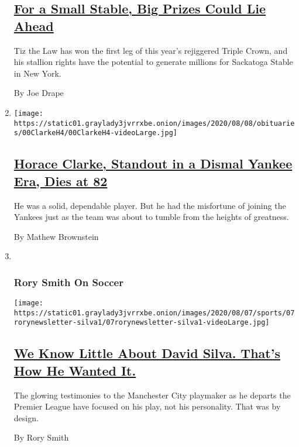 \begin{enumerate}
  \hypertarget{for-a-small-stable-big-prizes-could-lie-ahead}{%
  \subsection{\texorpdfstring{\href{/2020/08/07/sports/tiz-the-law-millions.html}{For
  a Small Stable, Big Prizes Could Lie
  Ahead}}{For a Small Stable, Big Prizes Could Lie Ahead}}\label{for-a-small-stable-big-prizes-could-lie-ahead}}

  Tiz the Law has won the first leg of this year's rejiggered Triple
  Crown, and his stallion rights have the potential to generate millions
  for Sackatoga Stable in New York.

  By Joe Drape
\item
  \texttt{[image: https://static01.graylady3jvrrxbe.onion/images/2020/08/08/obituaries/00ClarkeH4/00ClarkeH4-videoLarge.jpg]}

  \hypertarget{horace-clarke-standout-in-a-dismal-yankee-era-dies-at-82}{%
  \subsection{\texorpdfstring{\href{/2020/08/07/sports/baseball/horace-clarke-dead.html}{Horace
  Clarke, Standout in a Dismal Yankee Era, Dies at
  82}}{Horace Clarke, Standout in a Dismal Yankee Era, Dies at 82}}\label{horace-clarke-standout-in-a-dismal-yankee-era-dies-at-82}}

  He was a solid, dependable player. But he had the misfortune of
  joining the Yankees just as the team was about to tumble from the
  heights of greatness.

  By Mathew Brownstein
\item ~
  \hypertarget{rory-smith-on-soccer}{%
  \subsubsection{Rory Smith On Soccer}\label{rory-smith-on-soccer}}

  \texttt{[image: https://static01.graylady3jvrrxbe.onion/images/2020/08/07/sports/07rorynewsletter-silva1/07rorynewsletter-silva1-videoLarge.jpg]}

  \hypertarget{we-know-little-about-david-silva-thats-how-he-wanted-it}{%
  \subsection{\texorpdfstring{\href{/2020/08/07/sports/soccer/david-silva-manchester-city.html}{We
  Know Little About David Silva. That's How He Wanted
  It.}}{We Know Little About David Silva. That's How He Wanted It.}}\label{we-know-little-about-david-silva-thats-how-he-wanted-it}}

  The glowing testimonies to the Manchester City playmaker as he departs
  the Premier League have focused on his play, not his personality. That
  was by design.

  By Rory Smith
\end{enumerate}

